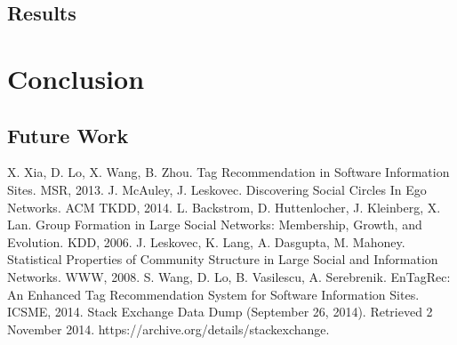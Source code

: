 \documentclass[10pt]{IEEEtran}
\begin{document}
\subsection{Results}

\section{Conclusion}

\subsection{Future Work}

\begin{thebibliography}{1}
 X. Xia, D. Lo, X. Wang, B. Zhou. Tag Recommendation in Software Information Sites. MSR, 2013.
 J. McAuley, J. Leskovec. Discovering Social Circles In Ego Networks. ACM TKDD, 2014.
 L. Backstrom, D. Huttenlocher, J. Kleinberg, X. Lan. Group Formation in Large Social Networks: Membership, Growth, and Evolution. KDD, 2006.
 J. Leskovec, K. Lang, A. Dasgupta, M. Mahoney. Statistical Properties of Community Structure in Large Social and Information Networks. WWW, 2008.
 S. Wang, D. Lo, B. Vasilescu, A. Serebrenik. EnTagRec: An Enhanced Tag Recommendation System for Software Information Sites. ICSME, 2014.
 Stack Exchange Data Dump (September 26, 2014). Retrieved 2 November 2014. https://archive.org/details/stackexchange.
\end{thebibliography}

\end{document}
